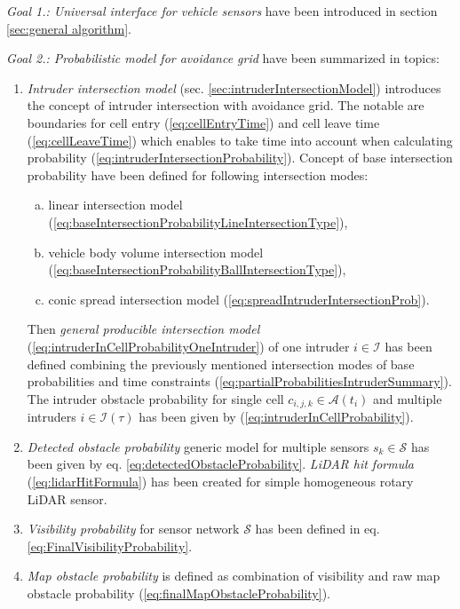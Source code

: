 \noindent\emph{Goal 1.: Universal interface for vehicle sensors} have been introduced in section \ref{sec:general algorithm}.

\noindent\emph{Goal 2.: Probabilistic model for avoidance grid} have been summarized in topics:
\begin{enumerate}
    \item\emph{Intruder intersection model} (sec. \ref{sec:intruderIntersectionModel}) introduces the concept of intruder intersection with avoidance grid. The notable are boundaries for cell entry (\ref{eq:cellEntryTime}) and cell leave time (\ref{eq:cellLeaveTime}) which enables to take time into account when calculating probability (\ref{eq:intruderIntersectionProbability}). Concept of base intersection probability have been defined for following intersection modes:
    \begin{enumerate}[a.]
        \item linear intersection model (\ref{eq:baseIntersectionProbabilityLineIntersectionType}),
        \item vehicle body volume intersection model (\ref{eq:baseIntersectionProbabilityBallIntersectionType}),
        \item conic spread intersection model (\ref{eq:spreadIntruderIntersectionProb}).
    \end{enumerate}
    \noindent Then \emph{general producible intersection model} (\ref{eq:intruderInCellProbabilityOneIntruder}) of one intruder $i\in\mathscr{I}$ has been defined combining the previously mentioned intersection modes of base probabilities and time constraints (\ref{eq:partialProbabilitiesIntruderSummary}). The intruder obstacle probability for single cell $c_{i,j,k}\in\mathscr{A}(t_i)$ and multiple intruders $i \in \mathscr{I}(\tau)$ has been given by (\ref{eq:intruderInCellProbability}).
    
    \item\emph{Detected obstacle probability} generic model for multiple sensors $s_k\in\mathscr{S}$ has been given by eq. \ref{eq:detectedObstacleProbability}. \textit{LiDAR hit formula} (\ref{eq:lidarHitFormula}) has been created for simple homogeneous rotary LiDAR sensor.
    
    \item\emph{Visibility probability} for sensor network $\mathscr{S}$ has been defined in eq. \ref{eq:FinalVisibilityProbability}.
    
    \item\emph{Map obstacle probability} is defined as combination of visibility and raw map obstacle probability (\ref{eq:finalMapObstacleProbability}).
\end{enumerate}

